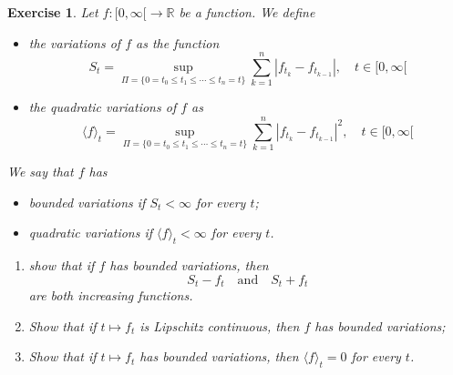 \documentclass[DIV=classic,a4paper,10pt]{scrartcl}
\newtheorem{exercise}[theorem]{Exercise}
\theoremstyle{nonumberplain}
\numberwithin{equation}{section}
\begin{document}
\begin{exercise}
    Let $f:[0,\infty[\to \mathbb{R}$ be a function.
    We define
    \begin{itemize}
        \item the variations of $f$ as the function 
            \begin{equation*}
                S_t=\sup_{\Pi=\{0=t_0\leq t_1\leq \cdots \leq t_n=t\}} \sum_{k=1}^n \left|f_{t_k}-f_{t_{k-1}}\right|, \quad t \in [0,\infty[
            \end{equation*}
        \item the quadratic variations of $f$ as
            \begin{equation*}
                \langle f\rangle_t=\sup_{\Pi=\{0=t_0\leq t_1\leq \cdots \leq t_n=t\}} \sum_{k=1}^n \left|f_{t_k}-f_{t_{k-1}}\right|^2, \quad t \in [0,\infty[
            \end{equation*}
    \end{itemize}
    We say that $f$ has 
    \begin{itemize}
        \item bounded variations if $S_t<\infty$ for every $t$;
        \item quadratic variations if $\langle f\rangle_t<\infty$ for every $t$.
    \end{itemize}

    \begin{enumerate}[label=\textit{(\roman*)},fullwidth]
        \item show that if $f$ has bounded variations, then
            \begin{equation*}
                S_t-f_t\quad \text{and}\quad S_t+f_t
            \end{equation*}
            are both increasing functions.
        \item Show that if $t\mapsto f_t$ is Lipschitz continuous, then $f$ has bounded variations;
        \item Show that if $t \mapsto f_t$ has bounded variations, then $\langle f\rangle_t=0$ for every $t$.
    \end{enumerate}
\end{exercise}
\end{document}
